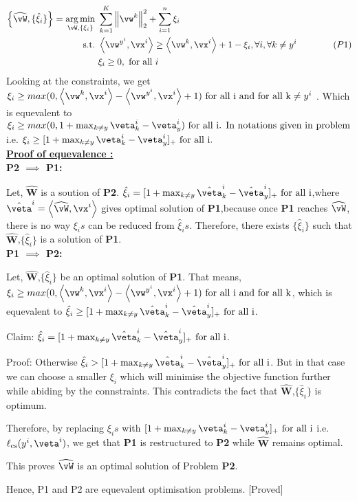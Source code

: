 \documentclass[a4paper,11pt]{article}
\newcommand\tab[1][0.6cm]{\hspace*{#1}}
\begin{document}
\begin{mlsolution}
\begin{align*}
\bc{\widehat\vW, \{\hat\xi_i\}} = \underset{\vW,\bc{\xi_i}}{\arg\min}&\ \sum_{k=1}^K\norm{\vw^k}_2^2 + \sum_{i=1}^n\xi_i\\ 
\text{s.t.} &\ \ip{\vw^{y^i}}{\vx^i} \geq \ip{\vw^k}{\vx^i} + 1 - \xi_i, \forall i, \forall k \neq y^i\qquad\qquad{(P1)}\\
&\ \xi_i \geq 0, \text{ for all } i
\end{align*}
Looking at the constraints, we get $\xi_i \geq max(0,\ip{\vw^k}{\vx^i} - \ip{\vw^{y^i}}{\vx^i} + 1) \text{ for all i and }\text{for all k} \neq y^i$ . Which is equevalent to $\xi_i \geq max(0,1 + \max_{k \neq y}\veta^i_k - \veta^i_y) \text{ for all i. In notations given in problem}$ 
i.e. $\xi_i \geq [1 + \max_{k \neq y}\veta^i_k - \veta^i_y]_+ \text{ for all i.} $ \\[0.5 em]
\underline{\textbf{Proof of equevalence :}}\\[0.1em]

\textbf{P2 $\implies$ P1:}

\tab Let, $\mathbf{\widehat{W}}$ is a soution of \textbf{P2}. $\hat\xi_i = [1 + \max_{k \neq y}\hat\veta^i_k - \hat\veta^i_y]_+ \text{ for all i}$,where $\hat\veta^i = \ip{\widehat{\vW}}{\vx^i}$  gives optimal solution of \textbf{P1},because once \textbf{P1} reaches $\widehat{\vW}$, there is no way $\xi_is$ can be reduced from $\hat\xi_is$. Therefore, there exists $\{\hat\xi_i\}$ such that $\widehat{\textbf{W}}$,$\{\hat\xi_i\}$ is a solution of \textbf{P1}.\\[0.1em]

\textbf{P1 $\implies$ P2:}

	\tab Let,  $\widehat{\textbf{W}}$,$\{\hat\xi_i\}$ be an optimal solution of \textbf{P1}. That means,  $\xi_i \geq max(0,\ip{\vw^k}{\vx^i} - \ip{\vw^{y^i}}{\vx^i} + 1) \text{ for all i and }\text{for all k}$, which is equevalent to  $\hat\xi_i \geq [1 + \max_{k \neq y}\hat\veta^i_k - \hat\veta^i_y]_+ \text{ for all i}$. 
	
	\tab Claim: $\hat\xi_i = [1 + \max_{k \neq y}\hat\veta^i_k - \hat\veta^i_y]_+ \text{ for all i}$. 
	
	\tab Proof: Otherwise $\hat\xi_i > [1 + \max_{k \neq y}\hat\veta^i_k - \hat\veta^i_y]_+ \text{ for all i}$. But in that case we can choose a smaller $\xi_i$ which will minimise the objective function further while abiding by the connstraints. This contradicts the fact that $\widehat{\textbf{W}}$,$\{\hat\xi_i\}$ is optimum.
	
	\tab Therefore, by replacing $\xi_is$ with $[1 + \max_{k \neq y}\veta^i_k - \veta^i_y]_+ \text{ for all i}$ i.e. $\ell_\text{cs}(y^i,\veta^i)$, we get that \textbf{P1} is  restructured to \textbf{P2} while $\widehat{\textbf{W}}$ remains optimal. 
	
	\tab This proves $\widehat{\vW}$ is an optimal solution of Problem \textbf{P2}.
	
	Hence, P1 and P2 are equevalent optimisation problems. [Proved]
	
\end{mlsolution}
\end{document}
